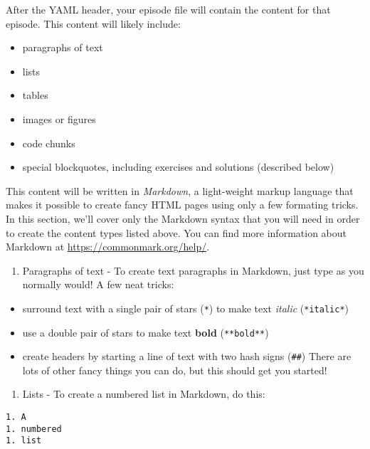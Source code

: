 \documentclass[
]{book}
\providecommand{\tightlist}{%
  \setlength{\itemsep}{0pt}\setlength{\parskip}{0pt}}
\begin{document}
After the YAML header, your episode file will contain the content for that episode. This content will likely
include:

\begin{itemize}
\tightlist
\item
  paragraphs of text
\item
  lists
\item
  tables
\item
  images or figures
\item
  code chunks
\item
  special blockquotes, including exercises and solutions (described below)
\end{itemize}

This content will be written in \emph{Markdown}, a light-weight markup language that makes it possible to create
fancy HTML pages using only a few formating tricks. In this section, we'll cover only the Markdown syntax that
you will need in order to create the content types listed above. You can find more information about Markdown
at \url{https://commonmark.org/help/}.

\begin{enumerate}
\def\labelenumi{\arabic{enumi}.}
\tightlist
\item
  Paragraphs of text - To create text paragraphs in Markdown, just type as you normally would! A few neat tricks:
\end{enumerate}

\begin{itemize}
\tightlist
\item
  surround text with a single pair of stars (\texttt{*}) to make text \emph{italic} (\texttt{*italic*})
\item
  use a double pair of stars to make text \textbf{bold} (\texttt{**bold**})
\item
  create headers by starting a line of text with two hash signs (\texttt{\#\#})
  There are lots of other fancy things you can do, but this should get you started!
\end{itemize}

\begin{enumerate}
\def\labelenumi{\arabic{enumi}.}
\tightlist
\item
  Lists - To create a numbered list in Markdown, do this:
\end{enumerate}

\begin{verbatim}
1. A
1. numbered
1. list
\end{verbatim}
\end{document}
